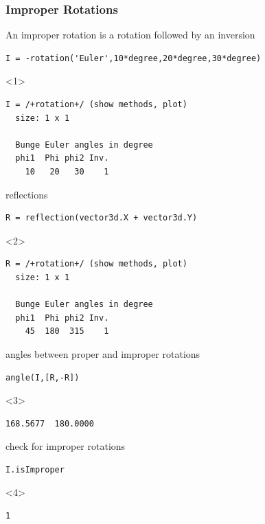\documentclass[compress]{beamer}
\begin{document}
\begin{frame}[fragile]
  \frametitle{Improper Rotations}

  \begin{overlayarea}{\textwidth}{7cm}

    An improper rotation is a rotation followed by an inversion
    \begin{lstlisting}[style=input]
I = -rotation('Euler',10*degree,20*degree,30*degree)
    \end{lstlisting}
    \begin{onlyenv}<1>
      \vspace{-0.3cm}
      \begin{lstlisting}[style=output]
I = /+rotation+/ (show methods, plot)
  size: 1 x 1

  Bunge Euler angles in degree
  phi1  Phi phi2 Inv.
    10   20   30    1
  \end{lstlisting}
  \end{onlyenv}

  \pause
  \bigskip

  reflections
  \begin{lstlisting}[style=input]
R = reflection(vector3d.X + vector3d.Y)
  \end{lstlisting}
  \begin{onlyenv}<2>
    \vspace{-0.3cm}
  \begin{lstlisting}[style=output]
R = /+rotation+/ (show methods, plot)
  size: 1 x 1

  Bunge Euler angles in degree
  phi1  Phi phi2 Inv.
    45  180  315    1
  \end{lstlisting}
  \end{onlyenv}

  \pause
  \bigskip

  angles between proper and improper rotations
  \begin{lstlisting}[style=input]
angle(I,[R,-R])
  \end{lstlisting}
  \begin{onlyenv}<3>
    \vspace{-0.3cm}
    \begin{lstlisting}[style=output]
  168.5677  180.0000
  \end{lstlisting}
  \end{onlyenv}

  \pause
  \bigskip

  check for improper rotations
\begin{lstlisting}[style=input]
I.isImproper
  \end{lstlisting}
  \begin{onlyenv}<4>
    \vspace{-0.3cm}
    \begin{lstlisting}[style=output]
  1
  \end{lstlisting}
  \end{onlyenv}

\end{overlayarea}
\end{frame}
\end{document}
